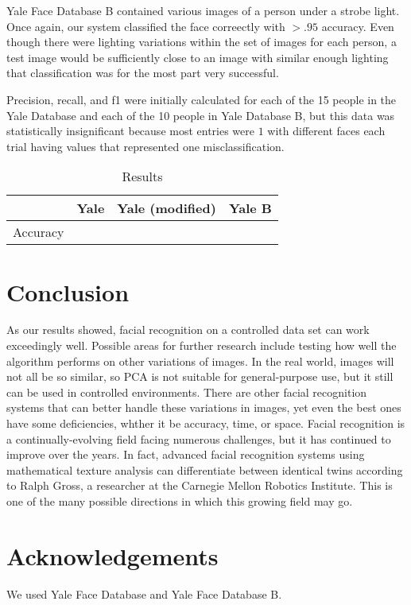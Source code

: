 \documentclass[letterpaper]{article}
\begin{document}
Yale Face Database B contained various images of a person under a strobe light.  Once again, our system classified the face correectly with $>.95$ accuracy.  Even though there were lighting variations within the set of images for each person, a test image would be sufficiently close to an image with similar enough lighting that classification was for the most part very successful. 

Precision, recall, and f1 were initially calculated for each of the 15 people in the Yale Database and each of the 10 people in Yale Database B, but this data was statistically insignificant because most entries were $1$ with different faces each trial having values that represented one misclassification. 
\begin{table}
\begin{center}
\caption{Results}
\begin {tabular} {|c|c|c|c|}
\hline
& \textrm{Yale} & \textrm{Yale (modified)} & \textrm{Yale B}\\
\hline
Accuracy &  &  &  \\
\hline
\end {tabular}
\end{center}
\end{table}
\section{Conclusion}
As our results showed, facial recognition on a controlled data set can work exceedingly well. Possible areas for further research include testing how well the algorithm performs on other variations of images.  In the real world, images will not all be so similar, so PCA is not suitable for general-purpose use, but it still can be used in controlled environments.  There are other facial recognition systems that can better handle these variations in images, yet even the best ones have some deficiencies, whther it be accuracy, time, or space.  Facial recognition is a continually-evolving field facing numerous challenges, but it has continued to improve over the years.  In fact, advanced facial recognition systems using mathematical texture analysis can differentiate between identical twins according to Ralph Gross, a researcher at the Carnegie Mellon Robotics Institute. This is one of the many possible directions in which this growing field may go.
\section{Acknowledgements}
We used Yale Face Database and Yale Face Database B.


\end{document}
